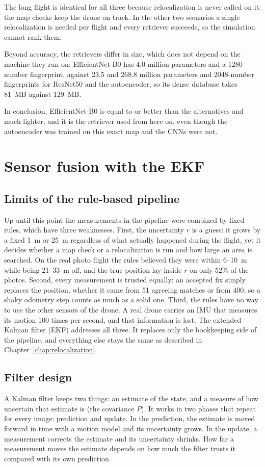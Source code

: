 \documentclass[english, Lau, oneside]{sapthesis}%
\begin{document}
The long flight is identical for all three because relocalization is never called on it: the map checks keep the drone on track. In the other two scenarios a single relocalization is needed per flight and every retriever succeeds, so the simulation cannot rank them.

Beyond accuracy, the retrievers differ in size, which does not depend on the machine they run on: EfficientNet-B0 has 4.0 million parameters and a 1280-number fingerprint, against 23.5 and 268.8 million parameters and 2048-number fingerprints for ResNet50 and the autoencoder, so its dense database takes 81~MB against 129~MB.

In conclusion, EfficientNet-B0 is equal to or better than the alternatives and much lighter, and it is the retriever used from here on, even though the autoencoder was trained on this exact map and the CNNs were not.

\chapter{Sensor fusion with the EKF}
\label{chap:ekf}
\section{Limits of the rule-based pipeline}
\label{sec:ekf-limits}
Up until this point the measurements in the pipeline were combined by fixed rules, which have three weaknesses. First, the uncertainty $r$ is a guess: it grows by a fixed 1~m or 25~m regardless of what actually happened during the flight, yet it decides whether a map check or a relocalization is run and how large an area is searched. On the real photo flight the rules believed they were within 6--10~m while being 21--33~m off, and the true position lay inside $r$ on only 52\% of the photos. Second, every measurement is trusted equally: an accepted fix simply replaces the position, whether it came from 51 agreeing matches or from 400, so a shaky odometry step counts as much as a solid one. Third, the rules have no way to use the other sensors of the drone. A real drone carries an IMU that measures its motion 100 times per second, and that information is lost. The extended Kalman filter (EKF) \citep{kalman1960,barshalom2001} addresses all three. It replaces only the bookkeeping side of the pipeline, and everything else stays the same as described in Chapter~\ref{chap:relocalization}.

\section{Filter design}
\label{sec:ekf-design}
A Kalman filter keeps two things: an estimate of the state, and a measure of how uncertain that estimate is (the covariance $P$). It works in two phases that repeat for every image: prediction and update. In the prediction, the estimate is moved forward in time with a motion model and its uncertainty grows. In the update, a measurement corrects the estimate and its uncertainty shrinks. How far a measurement moves the estimate depends on how much the filter trusts it compared with its own prediction.
\end{document}
